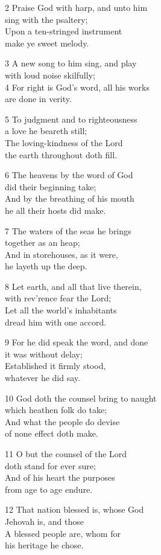 \begin{multicols}{3}
2 Praise God with harp, and unto him\\
sing with the psaltery;\\
Upon a ten-stringed instrument\\
make ye sweet melody.

3 A new song to him sing, and play\\
with loud noise skilfully;\\
4 For right is God’s word, all his works\\
are done in verity.

5 To judgment and to righteousness\\
a love he beareth still;\\
The loving-kindness of the Lord\\
the earth throughout doth fill.

6 The heavens by the word of God\\
did their beginning take;\\
And by the breathing of his mouth\\
he all their hosts did make.

7 The waters of the seas he brings\\
together as an heap;\\
And in storehouses, as it were,\\
he layeth up the deep.

8 Let earth, and all that live therein,\\
with rev’rence fear the Lord;\\
Let all the world’s inhabitants\\
dread him with one accord.

9 For he did speak the word, and done\\
it was without delay;\\
Established it firmly stood,\\
whatever he did say.

10 God doth the counsel bring to naught\\
which heathen folk do take;\\
And what the people do devise\\
of none effect doth make.

11 O but the counsel of the Lord\\
doth stand for ever sure;\\
And of his heart the purposes\\
from age to age endure.

12 That nation blessed is, whose God\\
Jehovah is, and those\\
A blessed people are, whom for\\
his heritage he chose.


\end{multicols}

